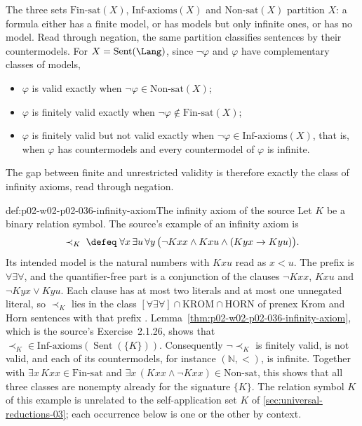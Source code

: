 The three sets \(\mathrm{Fin\text{-}sat}(X)\), \(\mathrm{Inf\text{-}axioms}(X)\)
and \(\mathrm{Non\text{-}sat}(X)\) partition \(X\): a formula either has a
finite model, or has models but only infinite ones, or has no model.  Read
through negation, the same partition classifies sentences by their
countermodels.  For \(X=\operatorname{Sent}(\Lang)\), since \(\neg\varphi\)
and \(\varphi\) have complementary classes of models,
\begin{itemize}
\item \(\varphi\) is valid exactly when \(\neg\varphi\in
      \mathrm{Non\text{-}sat}(X)\);
\item \(\varphi\) is finitely valid exactly when \(\neg\varphi\notin
      \mathrm{Fin\text{-}sat}(X)\);
\item \(\varphi\) is finitely valid but not valid exactly when
      \(\neg\varphi\in\mathrm{Inf\text{-}axioms}(X)\), that is, when
      \(\varphi\) has countermodels and every countermodel of \(\varphi\) is
      infinite.
\end{itemize}
The gap between finite and unrestricted validity is therefore exactly the
class of infinity axioms, read through negation.

\begin{hbexample}{def:p02-w02-p02-036-infinity-axiom}{The infinity axiom of the source}
Let \(K\) be a binary relation symbol.  The source's example of an infinity
axiom \cite[Sect.~2.1.2, p.~33]{BorgerGradelGurevich1997} is
\[
 \prec_K\;\defeq\;\forall x\,\exists u\,\forall y\,
 \bigl(\neg Kxx\land Kxu\land(Kyx\to Kyu)\bigr).
\]
Its intended model is the natural numbers with \(Kxu\) read as \(x<u\).  The
prefix is \(\forall\exists\forall\), and the quantifier-free part is a
conjunction of the clauses \(\neg Kxx\), \(Kxu\) and \(\neg Kyx\lor Kyu\).
Each clause has at most two literals and at most one unnegated literal, so
\(\prec_K\) lies in the class \([\forall\exists\forall]\cap\mathrm{KROM}\cap
\mathrm{HORN}\) of prenex Krom and Horn sentences with that prefix
\cite[Sect.~2.1.1, Def.~2.1.14]{BorgerGradelGurevich1997}.
Lemma~\ref{thm:p02-w02-p02-036-infinity-axiom}, which is the source's
Exercise~2.1.26, shows that
\(\prec_K\in\mathrm{Inf\text{-}axioms}(\operatorname{Sent}(\{K\}))\).
Consequently \(\neg\prec_K\) is finitely valid, is not valid, and each of its
countermodels, for instance \((\mathbb N,<)\), is infinite.  Together with
\(\exists x\,Kxx\in\mathrm{Fin\text{-}sat}\) and
\(\exists x\,(Kxx\land\neg Kxx)\in\mathrm{Non\text{-}sat}\), this shows that all
three classes are nonempty already for the signature \(\{K\}\).  The relation
symbol \(K\) of this example is unrelated to the self-application set \(K\)
of \cref{sec:universal-reductions-03}; each occurrence below is one or the
other by context.
\end{hbexample}

